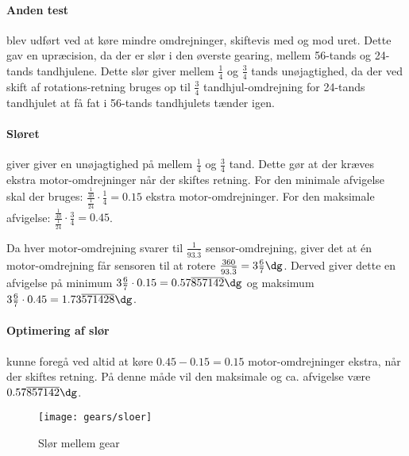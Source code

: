 \paragraph{Anden test} blev udført ved at køre mindre omdrejninger, skiftevis med og mod uret.
Dette gav en upræcision, da der er slør i den øverste gearing, mellem 56-tands og 24-tands tandhjulene.
Dette slør giver mellem $\frac{1}{4}$ og $\frac{3}{4}$ tands unøjagtighed, da der ved skift af rotations-retning bruges op til $\frac{3}{4}$ tandhjul-omdrejning for 24-tands tandhjulet at få fat i 56-tands tandhjulets tænder igen.

\paragraph{Sløret} giver giver en unøjagtighed på mellem $\frac{1}{4}$ og $\frac{3}{4}$ tand.
Dette gør at der kræves ekstra motor-omdrejninger når der skiftes retning.
For den minimale afvigelse skal der bruges: $ \frac{\frac{1}{40}}{\frac{1}{24}}\cdot\frac{1}{4} = 0.15$ ekstra motor-omdrejninger.
For den maksimale afvigelse: $ \frac{\frac{1}{40}}{\frac{1}{24}}\cdot\frac{3}{4} = 0.45$.

Da hver motor-omdrejning svarer til $\frac{1}{93.\overline{3}}$ sensor-omdrejning, giver det at én motor-omdrejning får sensoren til at rotere $\frac{360}{93.\overline{3}} = 3\frac{6}{7}\dg$.
Derved giver dette en afvigelse på minimum $3\frac{6}{7}\cdot0.15 = 0.57\overline{857142}\dg$ og maksimum $3\frac{6}{7}\cdot0.45 = 1.73\overline{571428}\dg$.

\paragraph{Optimering af slør} kunne foregå ved altid at køre $0.45 - 0.15 = 0.15$ motor-omdrejninger ekstra, når der skiftes retning.
På denne måde vil den maksimale og ca. afvigelse være $0.57\overline{857142}\dg$.

\begin{figure}[h]
\centering
\texttt{[image: gears/sloer]}
\caption{Slør mellem gear}
\label{gearing:sloer}
\end{figure}